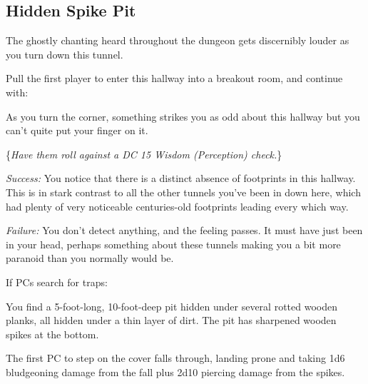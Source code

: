 \subsection{Hidden Spike Pit}
\label{sec:HiddenSpikePit}
\begin{readout}
  The ghostly chanting heard throughout the dungeon gets discernibly louder as you turn down this tunnel. 
\end{readout}
Pull the first player to enter this hallway into a breakout room, and continue with:
\begin{readout}
  As you turn the corner, something strikes you as odd about this hallway but you can't quite put your finger
  on it.
  
  \{\textit{Have them roll against a DC 15 Wisdom (Perception) check.}\}
  
  \textit{Success:} You notice that there is a distinct absence of footprints in this hallway. This is in stark
  contrast to all the other tunnels you've been in down here, which had plenty of very noticeable centuries-old
  footprints leading every which way.
  
  \textit{Failure:} You don't detect anything, and the feeling passes. It must have just been in your head,
  perhaps something about these tunnels making you a bit more paranoid than you normally would be.
\end{readout}
If PCs search for traps:
\begin{readout}
  You find a 5-foot-long, 10-foot-deep pit hidden under several rotted wooden planks, all hidden under a thin
  layer of dirt. The pit has sharpened wooden spikes at the bottom.
\end{readout}
The first PC to step on the cover falls through, landing prone and taking 1d6 bludgeoning damage from the fall
plus 2d10 piercing damage from the spikes.

\begin{arealinks}
\end{arealinks}


